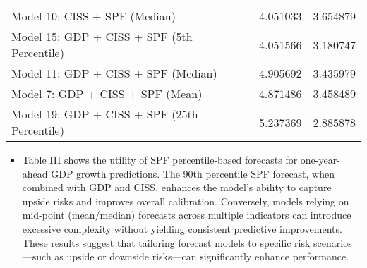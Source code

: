 \documentclass{article}
\begin{document}
\begin{table}[h!]
\begin{adjustbox}{width=\textwidth}
\begin{tabular}{l S[table-format=2.6] S[table-format=2.6]}
        Model 10: CISS + SPF (Median) & 4.051033 & 3.654879 \\
        Model 15: GDP + CISS + SPF (5th Percentile) & 4.051566 & 3.180747 \\
        Model 11: GDP + CISS + SPF (Median) & 4.905692 & 3.435979 \\
        Model 7: GDP + CISS + SPF (Mean) & 4.871486 & 3.458489 \\
        Model 19: GDP + CISS + SPF (25th Percentile) & 5.237369 & 2.885878 \\
        \bottomrule
    \end{tabular}
    \end{adjustbox}
    \label{tab:model_comparison_yoy}
\end{table}

\begin{itemize}
    \item Table III shows the utility of SPF percentile-based forecasts for one-year-ahead GDP growth predictions. The 90th percentile SPF forecast, when combined with GDP and CISS, enhances the model’s ability to capture upside risks and improves overall calibration. Conversely, models relying on mid-point (mean/median) forecasts across multiple indicators can introduce excessive complexity without yielding consistent predictive improvements. These results suggest that tailoring forecast models to specific risk scenarios—such as upside or downside risks—can significantly enhance performance.
\end{itemize}

\pagebreak
\printbibliography
\end{document}
